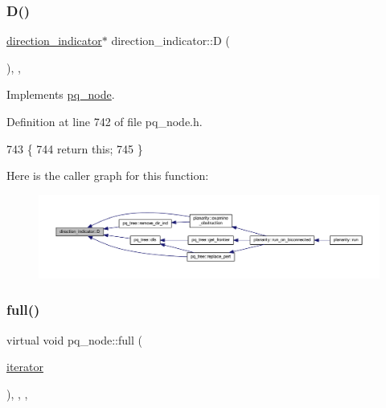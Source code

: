 \subsubsection{\texorpdfstring{D()}{D()}}
{\footnotesize\ttfamily \mbox{\hyperlink{classdirection__indicator}{direction\+\_\+indicator}}$\ast$ direction\+\_\+indicator\+::D (\begin{DoxyParamCaption}{ }\end{DoxyParamCaption})\hspace{0.3cm}{\ttfamily [inline]}, {\ttfamily [private]}, {\ttfamily [virtual]}}



Implements \mbox{\hyperlink{classpq__node_a5c85bd25c32bb6f18d6d8d1bfd35f260}{pq\+\_\+node}}.



Definition at line 742 of file pq\+\_\+node.\+h.


\begin{DoxyCode}
743     \{
744     \textcolor{keywordflow}{return} \textcolor{keyword}{this};
745     \}
\end{DoxyCode}
Here is the caller graph for this function\+:\nopagebreak
\begin{figure}[H]
\begin{center}
\leavevmode
\includegraphics[width=350pt]{classdirection__indicator_aef2ff42f0a64c7d10fbf42059c008f38_icgraph}
\end{center}
\end{figure}
\mbox{\label{classpq__node_af1ba861293e4493dba7cc2c9332fee76}} 
\subsubsection{\texorpdfstring{full()}{full()}}
{\footnotesize\ttfamily virtual void pq\+\_\+node\+::full (\begin{DoxyParamCaption}\item[{\mbox{\hyperlink{classpq__node_a34898c9eb1527787c07e8ebefd6bfba5}{iterator}}}]{ }\end{DoxyParamCaption})\hspace{0.3cm}{\ttfamily [inline]}, {\ttfamily [protected]}, {\ttfamily [virtual]}, {\ttfamily [inherited]}}



